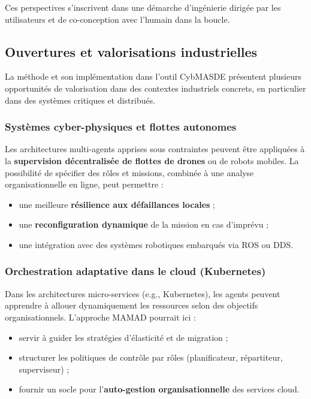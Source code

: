 Ces perspectives s’inscrivent dans une démarche d’ingénierie dirigée par les utilisateurs et de co-conception avec l’humain dans la boucle.

\subsection{Ouvertures et valorisations industrielles}
\label{sec:perspectives_industrielles}

\noindent
La méthode  et son implémentation dans l’outil CybMASDE présentent plusieurs opportunités de valorisation dans des contextes industriels concrets, en particulier dans des systèmes critiques et distribués.

\subsubsection*{Systèmes cyber-physiques et flottes autonomes}

Les architectures multi-agents apprises sous contraintes peuvent être appliquées à la \textbf{supervision décentralisée de flottes de drones} ou de robots mobiles. La possibilité de spécifier des rôles et missions, combinée à une analyse organisationnelle en ligne, peut permettre :
\begin{itemize}
    \item une meilleure \textbf{résilience aux défaillances locales} ;
    \item une \textbf{reconfiguration dynamique} de la mission en cas d’imprévu ;
    \item une intégration avec des systèmes robotiques embarqués via ROS ou DDS.
\end{itemize}

\subsubsection*{Orchestration adaptative dans le cloud (Kubernetes)}

Dans les architectures micro-services (e.g., Kubernetes), les agents peuvent apprendre à allouer dynamiquement les ressources selon des objectifs organisationnels. L’approche MAMAD pourrait ici :
\begin{itemize}
    \item servir à guider les stratégies d’élasticité et de migration ;
    \item structurer les politiques de contrôle par rôles (planificateur, répartiteur, superviseur) ;
    \item fournir un socle pour l’\textbf{auto-gestion organisationnelle} des services cloud.
\end{itemize}

